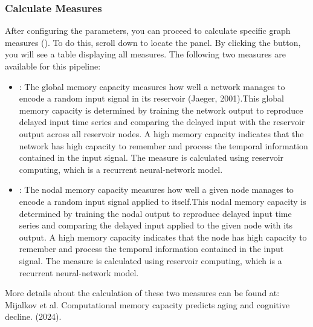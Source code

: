 \documentclass[justified]{tufte-handout}
\begin{document}
\clearpage
\subsubsection{Calculate Measures}
After configuring the parameters, you can proceed to calculate specific graph measures (). To do this, scroll down to locate the  panel. By clicking the  button, you will see a table displaying all measures. The following two measures are available for this pipeline:

\begin{itemize}
	
	\item {}: The global memory capacity measures how well a network manages to encode a random input signal in its reservoir (Jaeger, 2001).This global memory capacity is determined by training the network output to reproduce delayed input time series and comparing the delayed input with the reservoir output across all reservoir nodes. A high memory capacity indicates that the network has high capacity to remember and process the temporal information contained in the input signal. The measure is calculated using reservoir computing, which is a recurrent neural-network model.
	
	\item {}:	The nodal memory capacity measures how well a given node manages to encode a random input signal applied to itself.This nodal memory capacity is determined by training the nodal output to reproduce delayed input time series  and comparing the delayed input applied to the given node with its output.  A high memory capacity indicates that the node has high capacity to remember and process the temporal  information contained in the input signal. The measure is calculated using reservoir computing, which is a recurrent neural-network model.
	
\end{itemize}


 More details about the calculation of these two measures can be found at: Mijalkov et al. Computational memory capacity predicts aging and cognitive decline. (2024).
\end{document}
